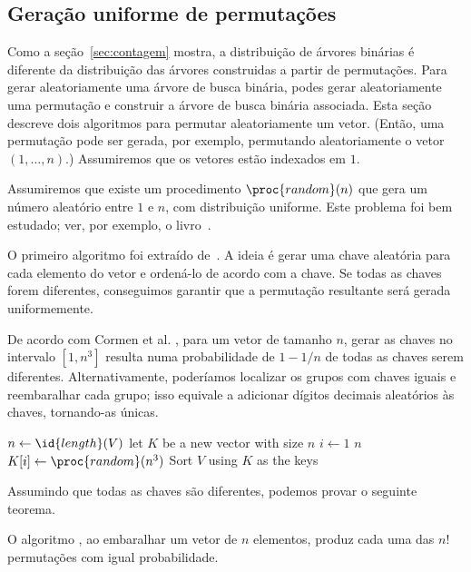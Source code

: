 \subsection{Geração uniforme de permutações}

Como a seção~\ref{sec:contagem} mostra,
a distribuição de árvores binárias é diferente
da distribuição das árvores construidas a partir de permutações.
Para gerar aleatoriamente uma árvore de busca binária,
podes gerar aleatoriamente uma permutação
e construir a árvore de busca binária associada.
Esta seção descreve dois algoritmos para permutar aleatoriamente um vetor.
(Então, uma permutação pode ser gerada, por exemplo,
permutando aleatoriamente o vetor $(1, \dots, n)$.)
Assumiremos que os vetores estão indexados em $1$.

Assumiremos que existe um procedimento $\proc{random}(n)$
que gera um número aleatório entre $1$ e $n$, com distribuição uniforme.
Este problema foi bem estudado; ver, por exemplo, o livro~\cite{Knuth1997}.

O primeiro algoritmo foi extraído de~\cite[p.125]{CormenLeisersonRivestStein2009}.
A ideia é gerar uma chave aleatória para cada elemento do vetor
e ordená-lo de acordo com a chave.
Se todas as chaves forem diferentes,
conseguimos garantir que a permutação resultante será gerada uniformemente.

De acordo com Cormen et al. \cite[p.~125]{CormenLeisersonRivestStein2009},
para um vetor de tamanho $n$,
gerar as chaves no intervalo $[1, n^3]$ resulta numa probabilidade de $1-1/n$
de todas as chaves serem diferentes.
Alternativamente, poderíamos localizar os grupos com chaves iguais
e reembaralhar cada grupo;
isso equivale a adicionar dígitos decimais aleatórios às chaves,
tornando-as únicas.

\begin{codebox}
    \li $n \gets \id{length}(V)$
    \li let $K$ be a new vector with size $n$
    \li \For $i \gets 1$ \To $n$
    \li \Do
            $K[i] \gets \proc{random}(n^3)$
    \End
    \li Sort $V$ using $K$ as the keys
\end{codebox}

Assumindo que todas as chaves são diferentes, podemos provar o seguinte teorema.

\begin{proposition}
    O algoritmo ,
    ao embaralhar um vetor de $n$ elementos,
    produz cada uma das $n!$ permutações
    com igual probabilidade.
\end{proposition}

